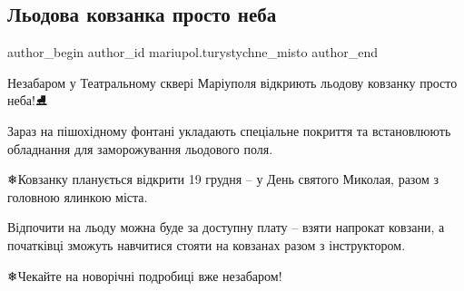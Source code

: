  
 
 
 
 

\subsection{Льодова ковзанка просто неба}
\label{sec:30_11_2021.fb.mariupol.turystychne_misto.1.ljodova_kovzanka_prosto_neba}

\ifcmt
 author_begin
   author_id mariupol.turystychne_misto
 author_end
\fi

Незабаром у Театральному сквері Маріуполя відкриють льодову ковзанку просто
неба!⛸

Зараз на пішохідному фонтані укладають спеціальне покриття та встановлюють
обладнання для заморожування льодового поля.  

❄Ковзанку планується відкрити 19 грудня – у День святого Миколая, разом з
головною ялинкою міста. 

Відпочити на льоду можна буде за доступну плату – взяти напрокат ковзани, а
початківці зможуть  навчитися стояти на ковзанах разом з інструктором.

❄Чекайте на новорічні подробиці вже незабаром!
